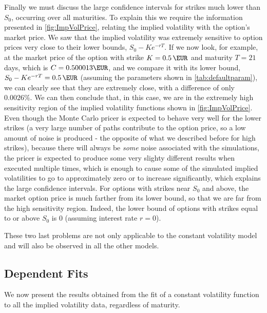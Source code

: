 Finally we must discuss the large confidence intervals for strikes much lower than $S_0$, occurring over all maturities. To explain this we require the information presented in \autoref{fig:ImpVolPrice}, relating the implied volatility with the option's market price. We saw that the implied volatility was extremely sensitive to option prices very close to their lower bounds, $S_0-Ke^{-rT}$. If we now look, for example, at the market price of the option with strike $K=\SI{0.5}{\EUR}$ and maturity $T=21$ days, which is $C=0.500013\SI{}{\EUR}$, and we compare it with its lower bound, $S_0-Ke^{-rT}=\SI{0.5}{\EUR}$ (assuming the parameters shown in \autoref{tab:defaultparam}), we can clearly see that they are extremely close, with a difference of only $0.0026\%$. We can then conclude that, in this case, we are in the extremely high sensitivity region of the implied volatility functions shown in \autoref{fig:ImpVolPrice}.
Even though the Monte Carlo pricer is expected to behave very well for the lower strikes (a very large number of paths contribute to the option price, so a low amount of noise is produced - the opposite of what we described before for high strikes), because there will always be \emph{some} noise associated with the simulations, the pricer is expected to produce some very slighty different results when executed multiple times, which is enough to cause some of the simulated implied volatilities to go to approximately zero or to increase significantly, which explains the large confidence intervals. For options with strikes near $S_0$ and above, the market option price is much farther from its lower bound, so that we are far from the high sensitivity region. Indeed, the lower bound of options with strikes equal to or above $S_0$ is 0 (assuming interest rate $r=0$).

These two last problems are not only applicable to the constant volatility model and will also be observed in all the other models.




\newpage

\subsection{Dependent Fits}
We now present the results obtained from the fit of a constant volatility function to all the implied volatility data, regardless of maturity.

